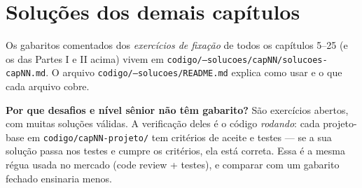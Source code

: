 \section{Soluções dos demais capítulos}

Os gabaritos comentados dos \emph{exercícios de fixação} de todos os
capítulos 5--25 (e os das Partes I e II acima) vivem em
\texttt{codigo/--solucoes/capNN/solucoes-capNN.md}. O arquivo
\texttt{codigo/--solucoes/README.md} explica como usar e o que cada arquivo
cobre.

\begin{caixadica}
\textbf{Por que desafios e nível sênior não têm gabarito?} São exercícios
abertos, com muitas soluções válidas. A verificação deles é o código
\emph{rodando}: cada projeto-base em \texttt{codigo/capNN-projeto/} tem
critérios de aceite e testes — se a sua solução passa nos testes e cumpre os
critérios, ela está correta. Essa é a mesma régua usada no mercado (code
review + testes), e comparar com um gabarito fechado ensinaria menos.
\end{caixadica}
